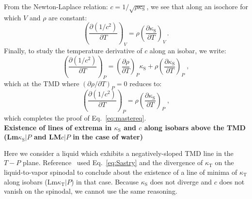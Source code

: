 \documentclass[12pt]{article}
\newcommand{\mrm}{\mathrm}
\newcommand{\kT}{\kappa_\mrm{T}}
\newcommand{\kS}{\kappa_\mrm{S}}
\begin{document}
From the Newton-Laplace relation: $c=1/\sqrt{\rho \kS}$, we see that along an isochore for which $V$ and $\rho$ are constant:
\begin{equation}
\left( \frac{\partial (1/c^2)}{\partial T} \right)_V = \rho \left( \frac{\partial \kS}{\partial T} \right)_V \, .
\label{eq:dinvc2dT_V}
\end{equation}
Finally, to study the temperature derivative of $c$ along an isobar, we write:
\begin{equation}
\left( \frac{\partial (1/c^2)}{\partial T}\right)_P = \left( \frac{\partial \rho}{\partial T}\right)_P \kS + \rho \left( \frac{\partial \kS}{\partial T}\right)_P \; ,
\label{eq:dinvc2dT_P}
\end{equation}
which at the TMD where $(\partial \rho / \partial T)_P = 0$ reduces to:
\begin{equation}
\left( \frac{\partial (1/c^2)}{\partial T}\right)_P = \rho \left( \frac{\partial \kS}{\partial T}\right)_P \; ,
\label{eq:dinvc2dT_P2}
\end{equation}
which completes the proof of Eq.~\ref{eq:mastereq}.\\

\textbf{Existence of lines of extrema in $\kS$ and $c$ along isobars above the TMD (Lm$\kS|P$ and LM$c|P$ in the case of water)}

Here we consider a liquid which exhibits a negatively-sloped TMD line in the $T-P$ plane. Reference~\cite{Sastry_singularityfree_1996} used Eq.~\ref{eq:Sastry} and the divergence of $\kT$ on the liquid-to-vapor spinodal to conclude about the existence of a line of minima of $\kT$ along isobars (Lm$\kT|P$) in that case. Because $\kS$ does not diverge and $c$ does not vanish on the spinodal, we cannot use the same reasoning.
\end{document}
